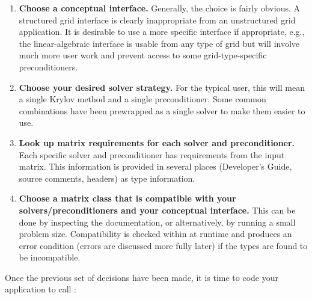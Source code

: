 \begin{enumerate}

\item
{\bf Choose a conceptual interface.} Generally, the choice is fairly obvious.
A structured grid 
interface is clearly inappropriate from an unstructured grid application. It is
desirable to use a more 
specific interface if appropriate, e.g., the linear-algebraic interface is
usable from any type of grid but 
will involve much more user work and prevent access to some grid-type-specific
preconditioners.

\item 
{\bf Choose your desired solver strategy. } For the typical user,
this will mean a single 
Krylov method and a single preconditioner. Some common combinations have been
prewrapped as a 
single solver to make them easier to use. 

\item 
{\bf Look up matrix requirements for each solver and preconditioner.} Each
specific solver and 
preconditioner has requirements from the input matrix. This 
information is provided in several places (Developer's Guide, source comments,
headers) as 
type information.

\item 
{\bf Choose a matrix class that is compatible with your solvers/preconditioners and your
conceptual 
interface.} This can be done by inspecting the documentation, or alternatively,
by running a small 
problem size.
Compatibility is checked within \hypre{} at runtime and produces
an error condition 
(errors are discussed more fully later) if the types are found to be
incompatible.

\end{enumerate}

Once the previous set of decisions have been made, it is time to code your application 
to call \hypre{}:

